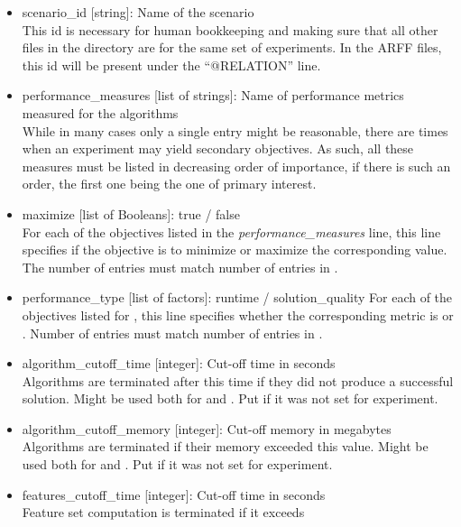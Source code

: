 \begin{itemize}
	\item scenario\_id [string]: Name of the scenario\\ 
		This id is necessary for human bookkeeping and making sure that all
		other files in the directory are for the same set of experiments. In the ARFF files, this id will be present 
		under the ``@RELATION'' line.
  	\item performance\_measures [list of strings]: Name of performance metrics measured for 
		the algorithms\\
		While in many cases only a single entry might be reasonable, there are times when an 
		experiment may yield secondary objectives. As such, all these measures must be listed in decreasing 
		order of importance, if there is such an order, the first one being the one of primary interest.
  	\item maximize [list of Booleans]: true / false\\ 
  	    For each of the objectives listed in the \textit{performance\_measures} line,
		this line specifies if the objective is to minimize or maximize the corresponding value. The number of entries 
		must match number of entries in .
  	\item performance\_type [list of factors]: runtime / solution\_quality
  	    For each of the objectives listed for ,
		this line specifies whether the corresponding metric is 
		or . Number of entries must match number of entries in 
		.
 	\item algorithm\_cutoff\_time [integer]: Cut-off time in seconds\\ 
 	    Algorithms are terminated after this time if they did 
		not produce a successful solution. Might be used both for  and .
  	      	Put \qm if it was not set for experiment.
  	\item algorithm\_cutoff\_memory [integer]: Cut-off memory in megabytes\\
  	    Algorithms are terminated if their memory
		exceeded this value. Might be used both for  and . Put \qm if it 
		was not set for experiment. 
  	\item features\_cutoff\_time [integer]: Cut-off time in seconds\\
  	    Feature set computation is terminated if it exceeds 

\end{itemize}
